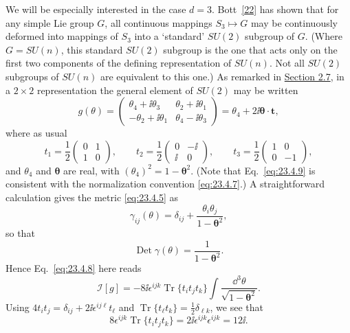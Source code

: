 We will be especially interested in the case $d=3$.
Bott~\hyperref[ch23-ref-22]{[22]} has shown that for any simple Lie group
$G$, all continuous mappings $S_3\mapsto G$ may be continuously deformed
into mappings of $S_3$ into a `standard' $SU(2)$ subgroup of $G$. (Where
$G=SU(n)$, this standard $SU(2)$ subgroup is the one that acts only on the
first two components of the defining representation of $SU(n)$. Not all
$SU(2)$ subgroups of $SU(n)$ are equivalent to this one.) As remarked in
\hyperref[sec:2.7]{Section 2.7}, in a $2\times2$ representation the general
element of $SU(2)$ may be written
\begin{equation}
g(\theta)=
\begin{pmatrix}
\theta_4+\ii\theta_3&\theta_2+\ii\theta_1\\
-\theta_2+\ii\theta_1&\theta_4-\ii\theta_3
\end{pmatrix}
=\theta_4+2\ii\boldsymbol{\theta}\cdot\mathbf t,
\tag{23.4.9}\label{eq:23.4.9}
\end{equation}
where as usual
\[
t_1=\frac12\begin{pmatrix}0&1\\1&0\end{pmatrix},
\qquad
t_2=\frac12\begin{pmatrix}0&-\ii\\\ii&0\end{pmatrix},
\qquad
t_3=\frac12\begin{pmatrix}1&0\\0&-1\end{pmatrix},
\]
and $\theta_4$ and $\boldsymbol{\theta}$ are real, with
$(\theta_4)^2=1-\boldsymbol{\theta}^2$. (Note that
Eq.~\eqref{eq:23.4.9} is consistent with the normalization convention
\eqref{eq:23.4.7}.) A straightforward calculation gives the metric
\eqref{eq:23.4.5} as
\begin{equation}
\gamma_{ij}(\theta)=\delta_{ij}
+\frac{\theta_i\theta_j}{1-\boldsymbol{\theta}^2},
\tag{23.4.10}\label{eq:23.4.10}
\end{equation}
so that
\begin{equation}
\operatorname{Det}\gamma(\theta)
=\frac{1}{1-\boldsymbol{\theta}^2}.
\tag{23.4.11}\label{eq:23.4.11}
\end{equation}
Hence Eq.~\eqref{eq:23.4.8} here reads
\[
\mathcal I[g]=-8\ii\epsilon^{ijk}\operatorname{Tr}\{t_it_jt_k\}
\int\frac{\dd^3\theta}{\sqrt{1-\boldsymbol{\theta}^2}}.
\]
Using $4t_it_j=\delta_{ij}+2\ii\epsilon^{ij\ell}t_\ell$ and
$\operatorname{Tr}\{t_\ell t_k\}=\frac12\delta_{\ell k}$, we see that
\[
8\epsilon^{ijk}\operatorname{Tr}\{t_it_jt_k\}
=2\ii\epsilon^{ijk}\epsilon^{ijk}=12\ii.
\]
